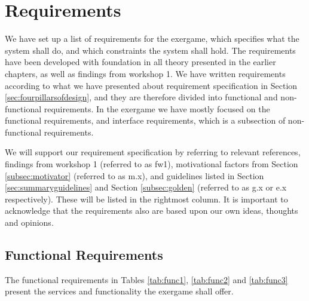 \section{Requirements}
\label{sec:req}
We have set up a list of requirements for the exergame, which specifies what the system shall do, and which constraints the system shall hold. The requirements have been developed with foundation in all theory presented in the earlier chapters, as well as findings from workshop 1. We have written requirements according to what we have presented about requirement specification in Section \ref{sec:fourpillarsofdesign}, and they are therefore divided into functional and non-functional requirements. In the exergame we have mostly focused on the functional requirements, and interface requirements, which is a subsection of non-functional requirements. 

We will support our requirement specification by referring to relevant references, findings from workshop 1 (referred to as fw1), motivational factors from Section \ref{subsec:motivator} (referred to as m.x), and guidelines listed in Section \ref{sec:summaryguidelines} and Section \ref{subsec:golden} (referred to as g.x or e.x respectively). These will be listed in the rightmost column. It is important to acknowledge that the requirements also are based upon our own ideas, thoughts and opinions. 

\subsection{Functional Requirements}
The functional requirements in Tables \ref{tab:func1}, \ref{tab:func2} and \ref{tab:func3} present the services and functionality the exergame shall offer.

